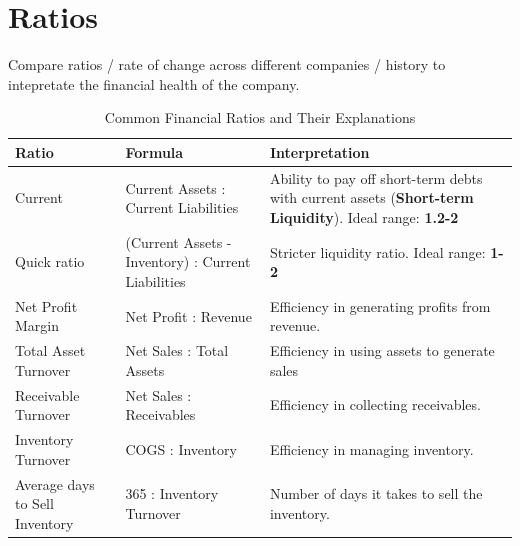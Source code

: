 \section{Ratios}
\label{sec:ratios}

Compare ratios / rate of change across different companies / history to intepretate the financial health of the company.

\begin{table}[h]
    \centering
    \begin{tabular}{|p{}|p{}|p{}|}
        \hline
        \textbf{Ratio}                    & \textbf{Formula}                                   & \textbf{Interpretation}                                                                                              \\
        \hline
        Current \label{def:current_ratio} & Current Assets : Current Liabilities               & Ability to pay off short-term debts with current assets (\textbf{Short-term Liquidity}). Ideal range: \textbf{1.2-2} \\
        \hline
        Quick ratio                       & (Current Assets - Inventory) : Current Liabilities & Stricter liquidity ratio. Ideal range: \textbf{1-2}                                                                  \\
        \hline
        Net Profit Margin                 & Net Profit : Revenue                               & Efficiency in generating profits from revenue.                                                                       \\
        \hline
        Total Asset Turnover              & Net Sales : Total Assets                           & Efficiency in using assets to generate sales                                                                         \\
        \hline
        Receivable Turnover               & Net Sales : Receivables                            & Efficiency in collecting receivables.                                                                                \\
        \hline
        Inventory Turnover                & COGS : Inventory                                   & Efficiency in managing inventory.                                                                                    \\
        \hline
        Average days to Sell Inventory    & 365 : Inventory Turnover                           & Number of days it takes to sell the inventory.                                                                       \\
        \hline
    \end{tabular}
    \caption{Common Financial Ratios and Their Explanations}
    \label{tab:financial_ratios}
\end{table}